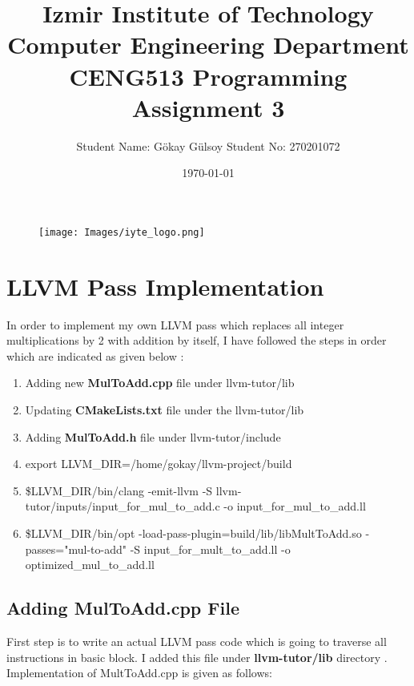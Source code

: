 \documentclass[16pt]{article}
\title{\bf{ Izmir Institute of Technology \\ Computer Engineering Department \\ CENG513 Programming Assignment 3}}
\author{Student Name: Gökay Gülsoy Student No: 270201072}
\date{\today}
\begin{document}
\pagecolor{myGray}
\pagestyle{fancy}
\renewcommand{\headrulewidth}{1pt}
\renewcommand{\footrulewidth}{1pt}
\renewcommand{\headruleskip}{2mm}
\renewcommand{\footruleskip}{2mm}

\fancyhead{} %
\fancyfoot{} %

\maketitle
\begin{figure}[H]
    \centering
    \texttt{[image: Images/iyte\_logo.png]}
\end{figure}

\newpage
\lstlistoflistings
\newpage

\section{LLVM Pass Implementation}
In order to implement my own LLVM pass which replaces all integer multiplications by 2 with addition by itself, I have followed the steps in order which are indicated as given below \cite{githubBanachspacellvmtutor} :

\begin{enumerate}
    \item Adding new \textbf{MulToAdd.cpp} file under llvm-tutor/lib
    \item Updating \textbf{CMakeLists.txt} file under the llvm-tutor/lib
    \item Adding \textbf{MulToAdd.h} file under llvm-tutor/include
    \item export LLVM\_DIR=/home/gokay/llvm-project/build
    \item \$LLVM\_DIR/bin/clang -emit-llvm -S llvm-tutor/inputs/input\_for\_mul\_to\_add.c -o input\_for\_mul\_to\_add.ll
    \item \$LLVM\_DIR/bin/opt -load-pass-plugin=build/lib/libMultToAdd.so -passes="mul-to-add" -S input\_for\_mult\_to\_add.ll -o optimized\_mul\_to\_add.ll 
\end{enumerate}

\subsection{Adding MulToAdd.cpp File }
First step is to write an actual LLVM pass code which is going to traverse all instructions in basic block. I added this file under \textbf{llvm-tutor/lib} directory \cite{2019LLVMDevelopersMetting}. Implementation of MultToAdd.cpp is given as follows:
\end{document}

